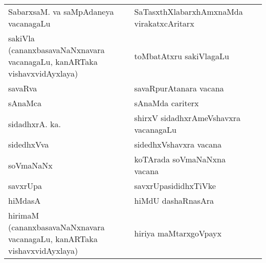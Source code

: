 {\begin{longtable}{>{\raggedright}p{3.5cm}ll}
SabarxsaM. va saMpAdaneya vacanagaLu & SaTasxthXlabarxhAmxnaMda virakatxcAritarx & \\
sakiVla (cananxbasavaNaNxnavara vacanagaLu, kanARTaka vishavxvidAyxlaya) & toMbatAtxru sakiVlagaLu & \\
savaRva & savaRpurAtanara vacana & \\
sAnaMca & sAnaMda cariterx & \\
sidadhxrA. ka. & shirxV sidadhxrAmeVshavxra vacanagaLu & \\
sidedhxVva & sidedhxVshavxra vacana & \\
soVmaNaNx & koTArada soVmaNaNxna vacana & \\
savxrUpa & savxrUpasididhxTiVke & \\
hiMdasA & hiMdU dashaRnasAra & \\
hirimaM (cananxbasavaNaNxnavara vacanagaLu, kanARTaka vishavxvidAyxlaya) & hiriya maMtarxgoVpayx & \\
\hline
\end{longtable}}


\newpage

